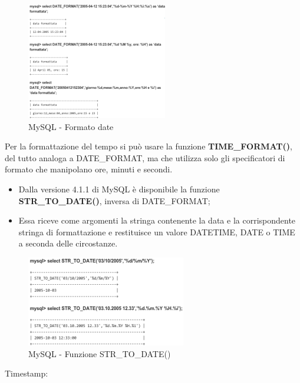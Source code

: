 \begin{center}
\begin{figure}[H]
\centering
\includegraphics[scale=1]{figures/mySQL_dateformat2.png}
\caption{MySQL - Formato date} 
\end{figure}
\end{center}

Per la formattazione del tempo si può usare la funzione \textbf{TIME\_FORMAT()}, del tutto analoga a DATE\_FORMAT, ma che utilizza solo gli specificatori di formato che manipolano ore, minuti e secondi. 

\begin{itemize}

\item Dalla versione 4.1.1 di MySQL è disponibile la funzione \textbf{STR\_TO\_DATE()}, inversa di DATE\_FORMAT;
\item Essa riceve come argomenti la stringa contenente la data e la corrispondente stringa di formattazione e restituisce un valore DATETIME, DATE o TIME a seconda delle circostanze.

\end{itemize}

\begin{center}
\begin{figure}[H]
\centering
\includegraphics[scale=1]{figures/mySQL_strtodate.png}
\caption{MySQL - Funzione STR\_TO\_DATE()} 
\end{figure}
\end{center}

Timestamp:

